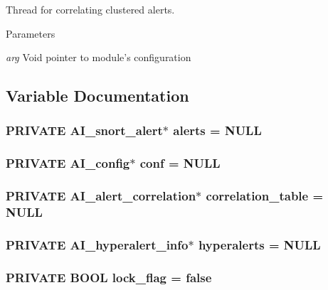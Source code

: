 Thread for correlating clustered alerts. 


\begin{DoxyParams}{Parameters}
\item[{\em arg}]Void pointer to module's configuration \end{DoxyParams}


\subsection{Variable Documentation}
\hypertarget{group__correlation_gae837fc04e61c0eb052f997c54b4fd9fe}{
\subsubsection[{alerts}]{\setlength{\rightskip}{0pt plus 5cm}PRIVATE {\bf AI\_\-snort\_\-alert}$\ast$ {\bf alerts} = NULL}}
\label{group__correlation_gae837fc04e61c0eb052f997c54b4fd9fe}
\hypertarget{group__correlation_gaad7a982b6016390e7cd1164bd7db8bca}{
\subsubsection[{conf}]{\setlength{\rightskip}{0pt plus 5cm}PRIVATE {\bf AI\_\-config}$\ast$ {\bf conf} = NULL}}
\label{group__correlation_gaad7a982b6016390e7cd1164bd7db8bca}
\hypertarget{group__correlation_ga701934a296c51f2397d24e8bf4a9f021}{
\subsubsection[{correlation\_\-table}]{\setlength{\rightskip}{0pt plus 5cm}PRIVATE {\bf AI\_\-alert\_\-correlation}$\ast$ {\bf correlation\_\-table} = NULL}}
\label{group__correlation_ga701934a296c51f2397d24e8bf4a9f021}
\hypertarget{group__correlation_gae56c79aa018caaeebeeb709a9e51c9c2}{
\subsubsection[{hyperalerts}]{\setlength{\rightskip}{0pt plus 5cm}PRIVATE {\bf AI\_\-hyperalert\_\-info}$\ast$ {\bf hyperalerts} = NULL}}
\label{group__correlation_gae56c79aa018caaeebeeb709a9e51c9c2}
\hypertarget{group__correlation_gafebc81c042a632dc987e113b7f390274}{
\subsubsection[{lock\_\-flag}]{\setlength{\rightskip}{0pt plus 5cm}PRIVATE {\bf BOOL} {\bf lock\_\-flag} = false}}
\label{group__correlation_gafebc81c042a632dc987e113b7f390274}
